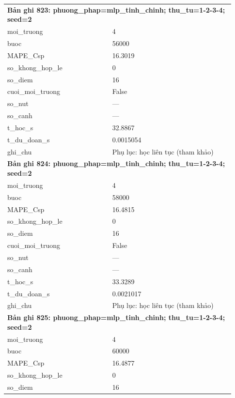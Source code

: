\begin{longtable}{p{0.43\linewidth}p{0.50\linewidth}}
\midrule
\multicolumn{2}{p{0.95\linewidth}}{\textbf{Bản ghi 823: phuong\_phap=mlp\_tinh\_chinh; thu\_tu=1-2-3-4; seed=2}} \\
moi\_\allowbreak truong & 4 \\
buoc & 56000 \\
MAPE\_\allowbreak Csp & 16.3019 \\
so\_\allowbreak khong\_\allowbreak hop\_\allowbreak le & 0 \\
so\_\allowbreak diem & 16 \\
cuoi\_\allowbreak moi\_\allowbreak truong & False \\
so\_\allowbreak nut & — \\
so\_\allowbreak canh & — \\
t\_\allowbreak hoc\_\allowbreak s & 32.8867 \\
t\_\allowbreak du\_\allowbreak doan\_\allowbreak s & 0.0015054 \\
ghi\_\allowbreak chu & Phụ lục: học liên tục (tham khảo) \\
\midrule
\multicolumn{2}{p{0.95\linewidth}}{\textbf{Bản ghi 824: phuong\_phap=mlp\_tinh\_chinh; thu\_tu=1-2-3-4; seed=2}} \\
moi\_\allowbreak truong & 4 \\
buoc & 58000 \\
MAPE\_\allowbreak Csp & 16.4815 \\
so\_\allowbreak khong\_\allowbreak hop\_\allowbreak le & 0 \\
so\_\allowbreak diem & 16 \\
cuoi\_\allowbreak moi\_\allowbreak truong & False \\
so\_\allowbreak nut & — \\
so\_\allowbreak canh & — \\
t\_\allowbreak hoc\_\allowbreak s & 33.3289 \\
t\_\allowbreak du\_\allowbreak doan\_\allowbreak s & 0.0021017 \\
ghi\_\allowbreak chu & Phụ lục: học liên tục (tham khảo) \\
\midrule
\multicolumn{2}{p{0.95\linewidth}}{\textbf{Bản ghi 825: phuong\_phap=mlp\_tinh\_chinh; thu\_tu=1-2-3-4; seed=2}} \\
moi\_\allowbreak truong & 4 \\
buoc & 60000 \\
MAPE\_\allowbreak Csp & 16.4877 \\
so\_\allowbreak khong\_\allowbreak hop\_\allowbreak le & 0 \\
so\_\allowbreak diem & 16 \\

\end{longtable}
